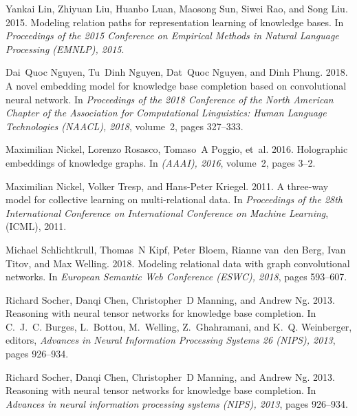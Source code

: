 \documentclass[11pt,a4paper]{article}
\begin{document}
\begin{thebibliography}{29}
Yankai Lin, Zhiyuan Liu, Huanbo Luan, Maosong Sun, Siwei Rao, and Song Liu.
  2015.
\newblock Modeling relation paths for representation learning of knowledge
  bases.
\newblock In \emph{Proceedings of the 2015 Conference on Empirical Methods in
  Natural Language Processing (EMNLP), 2015}.

Dai~Quoc Nguyen, Tu~Dinh Nguyen, Dat~Quoc Nguyen, and Dinh Phung. 2018.
\newblock A novel embedding model for knowledge base completion based on
  convolutional neural network.
\newblock In \emph{Proceedings of the 2018 Conference of the North American
  Chapter of the Association for Computational Linguistics: Human Language
  Technologies (NAACL), 2018}, volume~2, pages 327--333.

Maximilian Nickel, Lorenzo Rosasco, Tomaso~A Poggio, et~al. 2016.
\newblock Holographic embeddings of knowledge graphs.
\newblock In \emph{(AAAI), 2016}, volume~2, pages 3--2.

Maximilian Nickel, Volker Tresp, and Hans-Peter Kriegel. 2011.
\newblock A three-way model for collective learning on multi-relational data.
\newblock In \emph{Proceedings of the 28th International Conference on
  International Conference on Machine Learning}, (ICML), 2011.

Michael Schlichtkrull, Thomas~N Kipf, Peter Bloem, Rianne van~den Berg, Ivan
  Titov, and Max Welling. 2018.
\newblock Modeling relational data with graph convolutional networks.
\newblock In \emph{European Semantic Web Conference (ESWC), 2018}, pages
  593--607.

Richard Socher, Danqi Chen, Christopher~D Manning, and Andrew Ng.
  2013{}.
\newblock Reasoning with neural tensor networks for knowledge base completion.
\newblock In C.~J.~C. Burges, L.~Bottou, M.~Welling, Z.~Ghahramani, and K.~Q.
  Weinberger, editors, \emph{Advances in Neural Information Processing Systems
  26 (NIPS), 2013}, pages 926--934.

Richard Socher, Danqi Chen, Christopher~D Manning, and Andrew Ng.
  2013{}.
\newblock Reasoning with neural tensor networks for knowledge base completion.
\newblock In \emph{Advances in neural information processing systems (NIPS),
  2013}, pages 926--934.


\end{thebibliography}
\end{document}
